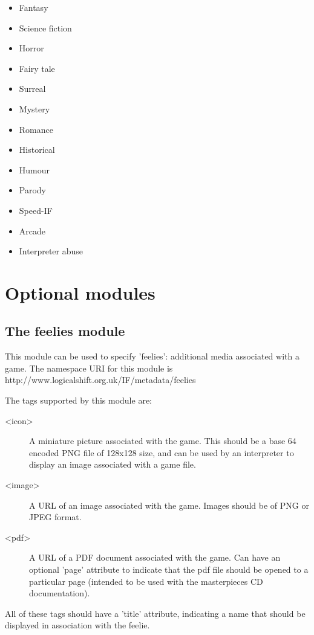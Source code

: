 \documentclass[a4paper,11pt]{article}
\begin{document}
\begin{itemize}
\item Fantasy
\item Science fiction
\item Horror
\item Fairy tale
\item Surreal
\item Mystery
\item Romance
\item Historical
\item Humour
\item Parody
\item Speed-IF
\item Arcade
\item Interpreter abuse
\end{itemize}

\section{Optional modules}

\subsection{The feelies module}

This module can be used to specify 'feelies': additional media associated with a game. The namespace URI for this module is 
http://www.logicalshift.org.uk/IF/metadata/feelies

The tags supported by this module are:

\begin{description}
\item[<icon>] A miniature picture associated with the game. This should be a base 64 encoded 
PNG file of 128x128 size, and can be used by an interpreter to display an image associated with
a game file.
\item[<image>] A URL of an image associated with the game. Images should be of PNG or
JPEG format.
\item[<pdf>] A URL of a PDF document associated with the game. Can have an optional 'page' attribute to indicate that the
pdf file should be opened to a particular page (intended to be used with the masterpieces
CD documentation).
\end{description}

All of these tags should have a 'title' attribute, indicating a name that should be displayed
in association with the feelie.
\end{document}
